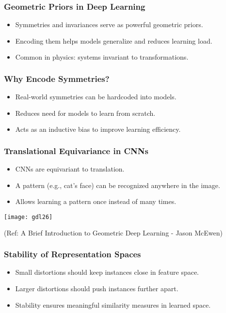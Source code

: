 \begin{frame}[fragile]\frametitle{Geometric Priors in Deep Learning}
  \begin{itemize}
    \item Symmetries and invariances serve as powerful geometric priors.
    \item Encoding them helps models generalize and reduces learning load.
    \item Common in physics: systems invariant to transformations.
  \end{itemize}
\end{frame}

\begin{frame}[fragile]\frametitle{Why Encode Symmetries?}
  \begin{itemize}
    \item Real-world symmetries can be hardcoded into models.
    \item Reduces need for models to learn from scratch.
    \item Acts as an inductive bias to improve learning efficiency.
  \end{itemize}
\end{frame}

\begin{frame}[fragile]\frametitle{Translational Equivariance in CNNs}
  \begin{itemize}
    \item CNNs are equivariant to translation.
    \item A pattern (e.g., cat’s face) can be recognized anywhere in the image.
    \item Allows learning a pattern once instead of many times.
  \end{itemize}
  
\begin{center}
\texttt{[image: gdl26]}

{\tiny (Ref: A Brief Introduction to Geometric Deep Learning - Jason McEwen)}
\end{center}
  
\end{frame}

\begin{frame}[fragile]\frametitle{Stability of Representation Spaces}
  \begin{itemize}
    \item Small distortions should keep instances close in feature space.
    \item Larger distortions should push instances further apart.
    \item Stability ensures meaningful similarity measures in learned space.
  \end{itemize}
\end{frame}

